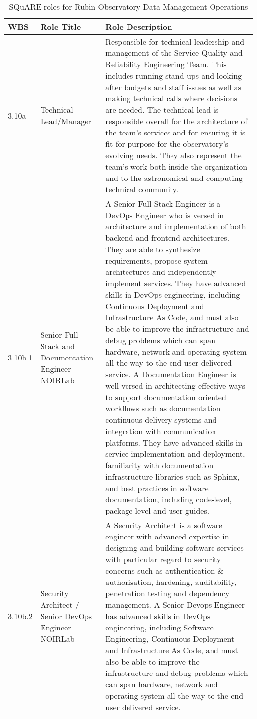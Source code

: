 \normalsize \begin{longtable} {|p{}|p{}|p{}|} \caption{SQuARE roles for Rubin Observatory Data Management Operations \label{tab:sqroles}}\\ 
\hline 
\textbf{WBS}&\textbf{Role Title}&\textbf{Role Description} \\ \hline
{3.10a}&{Technical Lead/Manager}&{Responsible for technical leadership and management of the Service Quality and Reliability Engineering Team. This includes running stand ups and looking after budgets and staff issues as well as making technical calls where decisions are needed. The technical lead is responsible overall for the architecture of the team’s services and for ensuring it is fit for purpose for the observatory’s evolving needs. They also represent the team’s work both inside the organization and to the astronomical and computing technical community.} \\ \hline
{3.10b.1}&{Senior Full Stack and Documentation Engineer - NOIRLab}&{A Senior Full-Stack Engineer is a DevOps Engineer who is versed in architecture and implementation of both backend and frontend architectures. They are able to synthesize requirements, propose system architectures and independently implement services. They have advanced skills in DevOps engineering, including Continuous Deployment and Infrastructure As Code, and must also be able to improve the infrastructure and debug problems which can span hardware, network and operating system all the way to the end user delivered service.
A Documentation Engineer is well versed in architecting effective ways to support documentation oriented workflows such as documentation continuous delivery systems and integration with communication platforms. They have advanced skills in service implementation and deployment, familiarity with documentation infrastructure libraries such as Sphinx, and best practices in software documentation, including code-level, package-level and user guides. 
} \\ \hline
{3.10b.2}&{Security Architect / Senior DevOps Engineer  - NOIRLab}&{A Security Architect is a software engineer with advanced expertise in designing and building software services with particular regard to security concerns such as authentication \& authorisation, hardening, auditability, penetration testing and dependency management.  A Senior Devops Engineer has advanced skills in DevOps engineering, including Software Engineering, Continuous Deployment and Infrastructure As Code, and must also be able to improve the infrastructure and debug problems which can span hardware, network and operating system all the way to the end user delivered service.
}
\end{longtable}
